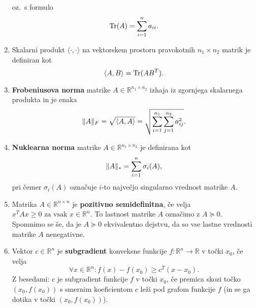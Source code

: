 \begin{enumerate}
  oz.\ s formulo
\[
    \operatorname{Tr}(A) = \sum_{i = 1}^{n} a_{ii}.
  \] 
  \item Skalarni produkt
    $\langle\cdot,\cdot\rangle$ na vektorskem prostoru pravokotnih $n_1\times n_2$ matrik je definiran kot \[
          \langle A, B \rangle = \operatorname{Tr}(AB^T).
        \]
  \item \textbf{Frobeniusova norma} matrike $A \in \mathbb{R}^{n_1 \times n_2}$ izhaja iz zgornjega skalarnega produkta in je enaka \[
            \lVert A\rVert_F = 
            \sqrt{\langle A, A \rangle}=
            \sqrt{\sum_{i = 1}^{n_1} \sum_{j = 1}^{n_2} a_{ij}^2}.
          \] 
  \item \textbf{Nuklearna norma} matrike $A\in \mathbb R^{n_1\times n_2}$ je definirana kot \[
          \lVert A\rVert_* = \sum_{i = 1}^{n} \sigma_i(A),
        \] pri čemer $\sigma_i(A)$ označuje $i$-to največjo singularno vrednost matrike $A$.
  \item Matrika $A \in \mathbb{R}^{n \times n}$ je \textbf{pozitivno semidefinitna}, če velja $x^TAx \ge 0 \text{ za vsak } x \in \mathbb{R}^n$. To lastnost matrike $A$ označimo z $A \succeq 0$. 
    Spomnimo se še, da je $A \succeq 0$ ekvivalentno dejstvu, da so vse  lastne vrednosti matrike $A$ nenegativne.
  \item Vektor $c\in \mathbb R^n$ je \textbf{subgradient} konveksne funkcije $f: \mathbb{R}^n \rightarrow \mathbb{R}$ v točki $x_0$, če velja
        \[
          \forall x\in\mathbb R^n: f(x) - f(x_0) \geq c^T(x - x_0).
        \] 
        Z besedami: $c$ je subgradient funkcije $f$ v točki $x_0$, če premica skozi točko $(x_0,f(x_0))$ s smernim koeficientom $c$ leži pod grafom funkcije $f$ (in se ga dotika v točki $(x_0,f(x_0))$).
\end{enumerate}






